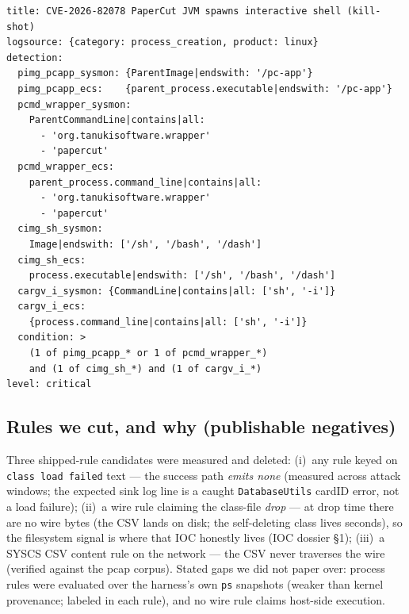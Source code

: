 \documentclass[journal]{IEEEtran}
\begin{document}
\begin{lstlisting}[style=yargen, caption={The process-creation Sigma rule
(abridged to detection logic; full file with aliases, false-positive notes and
tags: \texttt{detection/rules/sigma/\allowbreak cve2026\_82078\_\allowbreak pcapp\_sh\_child.yml};
pySigma-validated). Fired 4$\times$ over real process snapshots incl.\ a fresh
live reverse-shell run; 0 over 16 benign process events. Container debug
(\texttt{docker exec}) parents under entrypoint/init, which axis~1 excludes —
measured in clean-window snapshots, not assumed.}, label={lst:sigma}, xleftmargin=0.7em, xrightmargin=0.3em, basicstyle=\ttfamily\scriptsize]
title: CVE-2026-82078 PaperCut JVM spawns interactive shell (kill-shot)
logsource: {category: process_creation, product: linux}
detection:
  pimg_pcapp_sysmon: {ParentImage|endswith: '/pc-app'}
  pimg_pcapp_ecs:    {parent_process.executable|endswith: '/pc-app'}
  pcmd_wrapper_sysmon:
    ParentCommandLine|contains|all:
      - 'org.tanukisoftware.wrapper'
      - 'papercut'
  pcmd_wrapper_ecs:
    parent_process.command_line|contains|all:
      - 'org.tanukisoftware.wrapper'
      - 'papercut'
  cimg_sh_sysmon:
    Image|endswith: ['/sh', '/bash', '/dash']
  cimg_sh_ecs:
    process.executable|endswith: ['/sh', '/bash', '/dash']
  cargv_i_sysmon: {CommandLine|contains|all: ['sh', '-i']}
  cargv_i_ecs:
    {process.command_line|contains|all: ['sh', '-i']}
  condition: >
    (1 of pimg_pcapp_* or 1 of pcmd_wrapper_*)
    and (1 of cimg_sh_*) and (1 of cargv_i_*)
level: critical
\end{lstlisting}

\subsection{Rules we cut, and why (publishable negatives)}
Three shipped-rule candidates were measured and deleted: (i)~any rule keyed on
\texttt{class load failed} text — the success path \emph{emits none} (measured
across attack windows; the expected sink log line is a caught
\texttt{DatabaseUtils} cardID error, not a load failure); (ii)~a wire rule
claiming the class-file \emph{drop} — at drop time there are no wire bytes (the
CSV lands on disk; the self-deleting class lives seconds), so the filesystem
signal is where that IOC honestly lives (IOC dossier \S1); (iii)~a SYSCS CSV
content rule on the network — the CSV never traverses the wire (verified
against the pcap corpus). Stated gaps we did not paper over: process rules were
evaluated over the harness's own \texttt{ps} snapshots (weaker than kernel
provenance; labeled in each rule), and no wire rule claims host-side execution.
\end{document}
